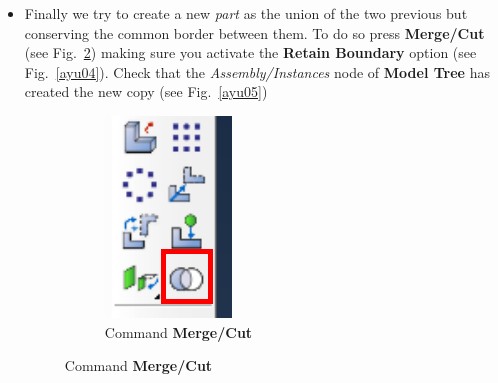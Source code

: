\begin{itemize}
\item Finally we try to create a new \textit{part} as the union of the
  two previous but conserving the common border between them. To do so
  press \textbf{Merge/Cut} (see Fig.~\ref{ayu02r}) making sure you
  activate the \textbf {Retain Boundary} option (see
  Fig.~\ref{ayu04}). Check that the \textit{Assembly/Instances} node
  of \textbf{Model Tree} has created the new copy (see
  Fig.~\ref{ayu05})
  \begin{figure}[!h]
    \centering
    \begin{subfigure}[!h]{0.15\textwidth}
      \includegraphics[width=\textwidth]{./body/images/ayu02r}
      \caption{Command \textbf{Merge/Cut}}
      \label{ayu02r}

\end{subfigure}
\end{figure}
\end{itemize}
